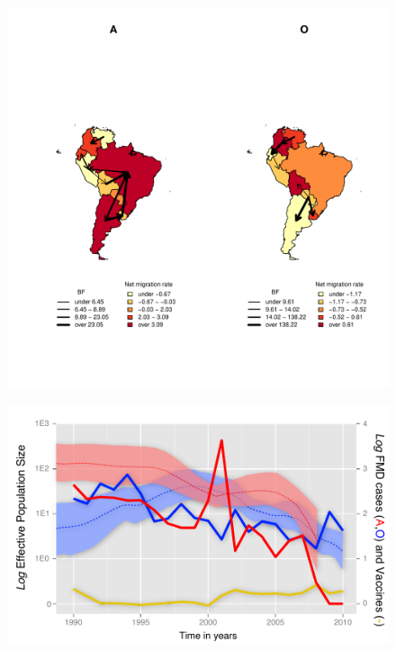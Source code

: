 \documentclass[10pt]{article}
\begin{document}
\begin{figure}[H]
\begin{center}
\includegraphics[scale=.85]{FIGURES/compound.pdf}
\end{center}
\caption{}
\label{fig:mj&BFs}
\end{figure}
\newpage
\begin{figure}[H]
\begin{center}
\includegraphics[scale=1.0]{FIGURES/skyride.pdf}
\end{center}
\caption{}
\label{fig:skyride}
\end{figure}
\end{document}
